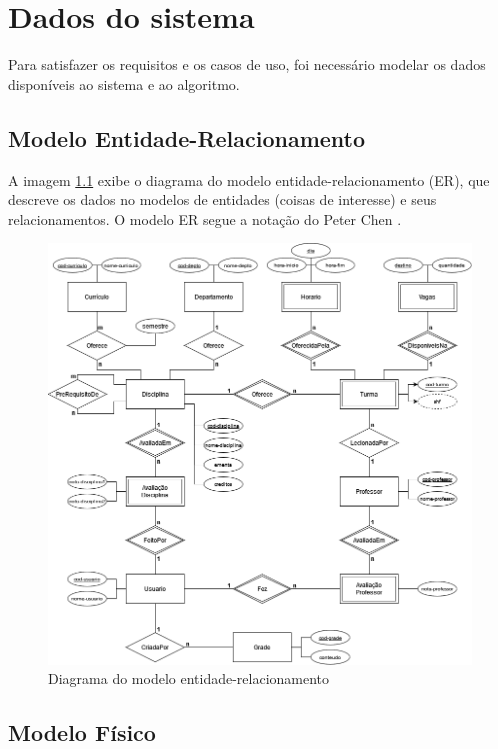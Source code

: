 \chapter{Dados do sistema}
\label{cha:Dados do sistema}

Para satisfazer os requisitos e os casos de uso, foi necessário modelar os dados disponíveis ao sistema e ao algoritmo.

\section{Modelo Entidade-Relacionamento}

A imagem \ref{fig:diagrama-classes} exibe o diagrama do modelo entidade-relacionamento (ER), que descreve os dados no modelos de entidades (coisas de interesse) e seus relacionamentos. O modelo ER segue a notação do Peter Chen \cite{peter-chen}. 

\begin{figure}[ht]
    \begin{center}
    \includegraphics[width=390pt]{figuras/diagrama-er-chen-pdf.png}
    \caption{Diagrama do modelo entidade-relacionamento}
    \label{fig:diagrama-classes}
    \end{center}
\end{figure}

\section{Modelo Físico}

